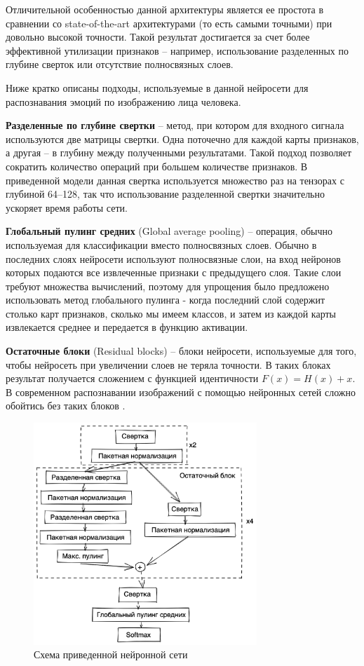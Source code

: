 \documentclass[a4paper,12pt]{article}
\begin{document}
    Отличительной особенностью данной архитектуры является ее простота в сравнении со state-of-the-art архитектурами (то есть самыми точными) при довольно высокой точности.
    Такой результат достигается за счет более эффективной утилизации признаков -- например, использование разделенных по глубине сверток или отсутствие полносвязных слоев.

    Ниже кратко описаны подходы, используемые в данной нейросети для распознавания эмоций по изображению лица человека.

    \textbf{Разделенные по глубине свертки} -- метод, при котором для входного сигнала используются две матрицы свертки.
    Одна поточечно для каждой карты признаков, а другая -- в глубину между полученными результатами.
    Такой подход позволяет сократить количество операций при большем количестве признаков.
    В приведенной модели данная свертка используется множество раз на тензорах с глубиной 64--128, так что использование разделенной свертки значительно ускоряет время работы сети.

    \textbf{Глобальный пулинг средних} (Global average pooling) -- операция, обычно используемая для классификации вместо полносвязных слоев.
    Обычно в последних слоях нейросети используют полносвязные слои, на вход нейронов которых подаются все извлеченные признаки с предыдущего слоя.
    Такие слои требуют множества вычислений, поэтому для упрощения было предложено использовать метод глобального пулинга - когда последний слой содержит столько карт признаков, сколько мы имеем классов, и затем из каждой карты извлекается среднее и передается в функцию активации.

    \textbf{Остаточные блоки} (Residual blocks) -- блоки нейросети, используемые для того, чтобы нейросеть при увеличении слоев не теряла точности.
    В таких блоках результат получается сложением с функцией идентичности $F(x) = H(x) + x$.
    В современном распознавании изображений с помощью нейронных сетей сложно обойтись без таких блоков \cite{resnet}.

    \begin{figure}[h]
        \caption{Схема приведенной нейронной сети}
        \centering
        \includegraphics[width=0.75\textwidth]{cnn}
    \end{figure}
\end{document}

